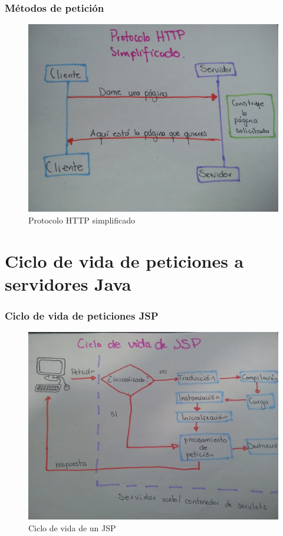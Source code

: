 \documentclass{beamer}
\begin{document}
\begin{frame}[fragile]
  \frametitle{Métodos de petición}
  \begin{figure}[ht]
    \centering
    \includegraphics[scale=0.05]{figures/image01.jpg}
    \caption{\label{fig:img01} Protocolo HTTP simplificado}
  \end{figure}
\end{frame}

\section{Ciclo de vida de peticiones a servidores Java}

\begin{frame}[fragile]
  \frametitle{Ciclo de vida de peticiones JSP}
  \begin{figure}[ht]
    \centering
    \includegraphics[scale=0.05]{figures/image02.jpg}
    \caption{\label{fig:img02} Ciclo de vida de un JSP}
  \end{figure}
\end{frame}
\end{document}
